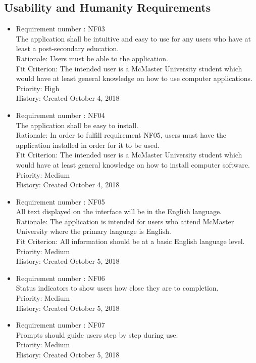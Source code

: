\documentclass[12pt, titlepage]{article}
\begin{document}
\subsection{Usability and Humanity Requirements}
\begin{itemize}
\item Requirement number : NF03 \\
The application shall be intuitive and easy to use for any users who have at least a post-secondary education.\\
Rationale: Users must be able to the application.\\
Fit Criterion: The intended user is a McMaster University student which would have at least general knowledge on how to use computer applications.\\
Priority: High\\
History: Created October 4, 2018

\item Requirement number : NF04 \\
The application shall be easy to install.\\
Rationale: In order to fulfill requirement NF05, users must have the application installed in order for it to be used.\\
Fit Criterion: The intended user is a McMaster University student which would have at least general knowledge on how to install computer software.\\
Priority: Medium\\
History: Created October 4, 2018

\item Requirement number : NF05\\
All text displayed on the interface will be in the English language.\\
Rationale: The application is intended for users who attend McMaster University where the primary language is English.\\
Fit Criterion: All information should be at a basic English language level.\\
Priority: Medium\\
History: Created October 5, 2018

\item Requirement number : NF06 \\
Status indicators to show users how close they are to completion.\\
Priority: Medium\\
History: Created October 5, 2018

\item Requirement number : NF07\\
Prompts should guide users step by step during use.\\
Priority: Medium\\
History: Created October 5, 2018

\end{itemize}
\end{document}
